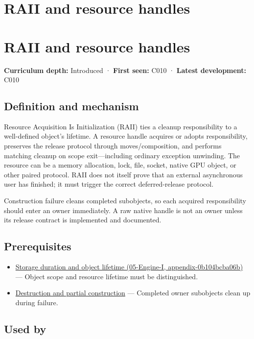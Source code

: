 \hypertarget{appendix-69739d3ab49b}{}
\section*{RAII and resource handles}
\section{RAII and resource handles}\label{raii-and-resource-handles}

\textbf{Curriculum depth:} Introduced · \textbf{First seen:} C010 · \textbf{Latest development:} C010

\subsection{Definition and mechanism}\label{definition-and-mechanism}

Resource Acquisition Is Initialization (RAII) ties a cleanup responsibility to a well-defined object's lifetime. A resource handle acquires or adopts responsibility, preserves the release protocol through moves/composition, and performs matching cleanup on scope exit---including ordinary exception unwinding. The resource can be a memory allocation, lock, file, socket, native GPU object, or other paired protocol. RAII does not itself prove that an external asynchronous user has finished; it must trigger the correct deferred-release protocol.

Construction failure cleans completed subobjects, so each acquired responsibility should enter an owner immediately. A raw native handle is not an owner unless its release contract is implemented and documented.

\subsection{Prerequisites}\label{prerequisites}

\begin{itemize}
\tightlist
\item
  \href{}{Storage duration and object lifetime (05-Engine-I, appendix-0b104bcba06b)} --- Object scope and resource lifetime must be distinguished.
\item
  \hyperref[appendix-9bfe377cef7a]{Destruction and partial construction} --- Completed owner subobjects clean up during failure.
\end{itemize}

\subsection{Used by}\label{used-by}


